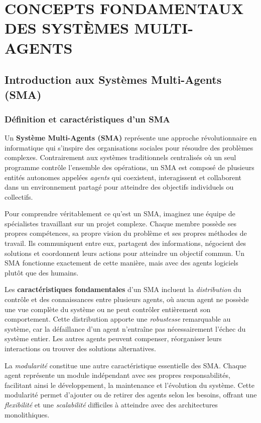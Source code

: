 \chapter{ CONCEPTS FONDAMENTAUX DES SYSTÈMES MULTI-AGENTS}

\section{Introduction aux Systèmes Multi-Agents (SMA)}

\subsection{Définition et caractéristiques d'un SMA}

Un \textbf{Système Multi-Agents (SMA)} représente une approche révolutionnaire en informatique qui s'inspire des organisations sociales pour résoudre des problèmes complexes. Contrairement aux systèmes traditionnels centralisés où un seul programme contrôle l'ensemble des opérations, un SMA est composé de plusieurs entités autonomes appelées \emph{agents} qui coexistent, interagissent et collaborent dans un environnement partagé pour atteindre des objectifs individuels ou collectifs.

Pour comprendre véritablement ce qu'est un SMA, imaginez une équipe de spécialistes travaillant sur un projet complexe. Chaque membre possède ses propres compétences, sa propre vision du problème et ses propres méthodes de travail. Ils communiquent entre eux, partagent des informations, négocient des solutions et coordonnent leurs actions pour atteindre un objectif commun. Un SMA fonctionne exactement de cette manière, mais avec des agents logiciels plutôt que des humains.

Les \textbf{caractéristiques fondamentales} d'un SMA incluent la \emph{distribution} du contrôle et des connaissances entre plusieurs agents, où aucun agent ne possède une vue complète du système ou ne peut contrôler entièrement son comportement. Cette distribution apporte une \emph{robustesse} remarquable au système, car la défaillance d'un agent n'entraîne pas nécessairement l'échec du système entier. Les autres agents peuvent compenser, réorganiser leurs interactions ou trouver des solutions alternatives.

La \emph{modularité} constitue une autre caractéristique essentielle des SMA. Chaque agent représente un module indépendant avec ses propres responsabilités, facilitant ainsi le développement, la maintenance et l'évolution du système. Cette modularité permet d'ajouter ou de retirer des agents selon les besoins, offrant une \emph{flexibilité} et une \emph{scalabilité} difficiles à atteindre avec des architectures monolithiques.

